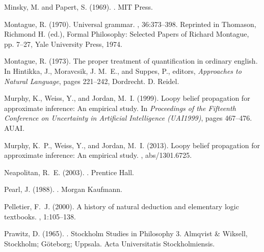 \documentclass[11pt]{article}
\begin{document}
\begin{thebibliography}{}
    Minsky, M. and Papert, S. (1969).
    .
    \newblock MIT Press.
    
    Montague, R. (1970).
    \newblock Universal grammar.
    , 36:373--398.
    \newblock Reprinted in Thomason, Richmond H. (ed.), Formal Philosophy: Selected
      Papers of Richard Montague, pp. 7--27, Yale University Press, 1974.
    
    Montague, R. (1973).
    \newblock The proper treatment of quantification in ordinary english.
    \newblock In Hintikka, J., Moravcsik, J. M.~E., and Suppes, P., editors, {\em
      Approaches to Natural Language}, pages 221--242, Dordrecht. D. Reidel.
    
    Murphy, K., Weiss, Y., and Jordan, M.~I. (1999).
    \newblock Loopy belief propagation for approximate inference: An empirical
      study.
    \newblock In {\em Proceedings of the Fifteenth Conference on Uncertainty in
      Artificial Intelligence (UAI1999)}, pages 467--476. AUAI.
    
    Murphy, K.~P., Weiss, Y., and Jordan, M.~I. (2013).
    \newblock Loopy belief propagation for approximate inference: An empirical
      study.
    , abs/1301.6725.
    
    Neapolitan, R.~E. (2003).
    .
    \newblock Prentice Hall.
    
    Pearl, J. (1988).
    .
    \newblock Morgan Kaufmann.
    
    Pelletier, F.~J. (2000).
    \newblock A history of natural deduction and elementary logic textbooks.
    , 1:105--138.
    
    Prawitz, D. (1965).
    .
    \newblock Stockholm Studies in Philosophy 3. Almqvist \& Wiksell, Stockholm;
      Göteborg; Uppsala.
    \newblock Acta Universitatis Stockholmiensis.
    

\end{thebibliography}
\end{document}
